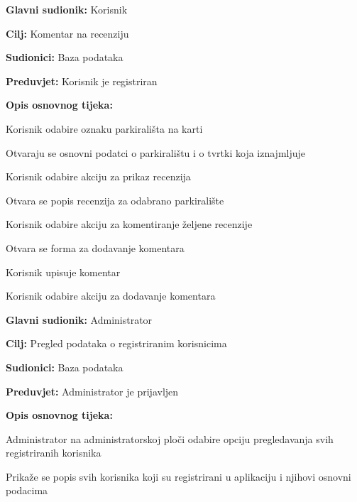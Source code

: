 \noindent {}
\begin{packed_item}
	
	\item \textbf{Glavni sudionik:} Korisnik
	\item  \textbf{Cilj:} Komentar na recenziju
	\item  \textbf{Sudionici:} Baza podataka
	\item  \textbf{Preduvjet:} Korisnik je registriran
	\item  \textbf{Opis osnovnog tijeka:}
	
	\item[] \begin{packed_enum}
		
		\item Korisnik odabire oznaku parkirališta na karti
		\item Otvaraju se osnovni podatci o parkiralištu i o tvrtki koja iznajmljuje
		\item Korisnik odabire akciju za prikaz recenzija
		\item Otvara se popis recenzija za odabrano parkiralište
		\item Korisnik odabire akciju za komentiranje željene recenzije
		\item Otvara se forma za dodavanje komentara
		\item Korisnik upisuje komentar
		\item Korisnik odabire akciju za dodavanje komentara
		
	\end{packed_enum}
\end{packed_item}

\noindent {}
\begin{packed_item}
	
	\item \textbf{Glavni sudionik:} Administrator
	\item  \textbf{Cilj:} Pregled podataka o registriranim korisnicima
	\item  \textbf{Sudionici:} Baza podataka
	\item  \textbf{Preduvjet:} Administrator je prijavljen
	\item  \textbf{Opis osnovnog tijeka:}
	
	\item[] \begin{packed_enum}
		
		\item Administrator na administratorskoj ploči odabire opciju pregledavanja svih registriranih korisnika 
		\item Prikaže se popis svih korisnika koji su registrirani u aplikaciju i njihovi osnovni podacima

	\end{packed_enum}
\end{packed_item}

